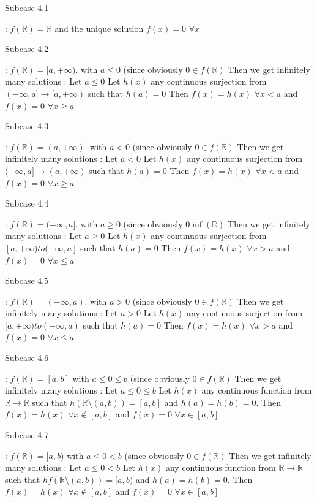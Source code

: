 \begin{solution}
\begin{bolded}Subcase 4.1\end{bolded} : $f(\mathbb R)=\mathbb R$ and the unique solution $f(x)=0$ $\forall x$

\begin{bolded}Subcase 4.2\end{bolded} : $f(\mathbb R)=[a,+\infty)$. with $a\le 0$ (since obviously $0\in f(\mathbb R)$
Then we get infinitely many solutions :
Let $a\le 0$
Let $h(x)$ any continuous surjection from $(-\infty,a]\to [a,+\infty)$ such that $h(a)=0$
Then $f(x)=h(x)$ $\forall x<a$ and $f(x)=0$ $\forall x\ge a$

\begin{bolded}Subcase 4.3\end{bolded} : $f(\mathbb R)=(a,+\infty)$. with $a< 0$ (since obviously $0\in f(\mathbb R)$
Then we get infinitely many solutions :
Let $a<0$
Let $h(x)$ any continuous surjection from $(-\infty,a] \to (a,+\infty)$ such that $h(a)=0$
Then $f(x)=h(x)$ $\forall x<a$ and $f(x)=0$ $\forall x\ge a$

\begin{bolded}Subcase 4.4 \end{bolded}: $f(\mathbb R)=(-\infty,a]$. with $a\ge 0$ (since obviously $0\inf(\mathbb R)$
Then we get infinitely many solutions :
Let $a\ge 0$
Let $h(x)$ any continuous surjection from $[a,+\infty)to(-\infty,a]$ such that $h(a)=0$
Then $f(x)=h(x)$ $\forall x>a$ and $f(x)=0$ $\forall x\le a$

\begin{bolded}Subcase 4.5\end{bolded} : $f(\mathbb R)=(-\infty,a)$. with $a>0$ (since obviously $0\in f(\mathbb R)$
Then we get infinitely many solutions :
Let $a>0$
Let $h(x)$ any continuous surjection from $[a,+\infty)to(-\infty,a)$ such that $h(a)=0$
Then $f(x)=h(x)$ $\forall x>a$ and $f(x)=0$ $\forall x\le a$

\begin{bolded}Subcase 4.6\end{bolded} : $f(\mathbb R)=[a,b]$ with $a\le 0\le b$ (since obviously $0\in f(\mathbb R)$
Then we get infinitely many solutions :
Let $a\le 0\le b$
Let $h(x)$ any continuous function from $\mathbb R\to\mathbb R$ such that $h(\mathbb R\setminus(a,b))=[a,b]$ and $h(a)=h(b)=0$.
Then $f(x)=h(x)$ $\forall x\notin[a,b]$ and $f(x)=0$ $\forall x\in[a,b]$

\begin{bolded}Subcase 4.7\end{bolded} : $f(\mathbb R)=[a,b)$ with $a\le 0< b$ (since obviously $0\in f(\mathbb R)$
Then we get infinitely many solutions :
Let $a\le 0< b$
Let $h(x)$ any continuous function from $\mathbb R\to\mathbb R$ such that $hf(\mathbb R\setminus(a,b))=[a,b)$ and $h(a)=h(b)=0$.
Then $f(x)=h(x)$ $\forall x\notin[a,b]$ and $f(x)=0$ $\forall x\in[a,b]$


\end{solution}
